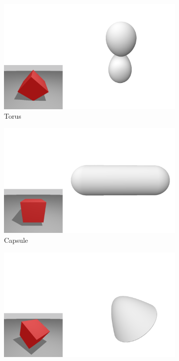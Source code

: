 \documentclass{l4proj}
\begin{document}
\begin{figure}[H]
  \begin{subfigure}[b]{0.33\textwidth}
    \includegraphics[width=\textwidth]{images/representations/3-4-torus.png}
    \caption{Torus}
    \label{fig:rep_4-3-torus}
  \end{subfigure}
  \begin{subfigure}[b]{0.33\textwidth}
    \includegraphics[width=\textwidth]{images/representations/3-4-capsuleX.png}
    \caption{Capsule}
    \label{fig:rep_4-3-capsule}
  \end{subfigure}
  \begin{subfigure}[b]{0.33\textwidth}
    \includegraphics[width=\textwidth]{images/representations/3-4-cone.png}

\end{subfigure}
\end{figure}
\end{document}
